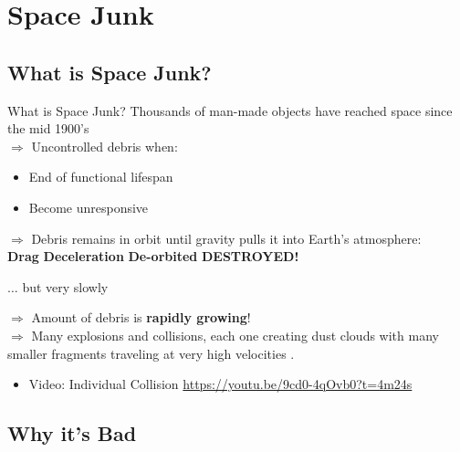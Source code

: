 \documentclass{beamer}
\begin{document}
\section{Space Junk}

\subsection{What is Space Junk?}

\begin{frame}{What is Space Junk?}
Thousands of man-made objects have reached space since the mid 1900's \cite{ODPO} \\
\(\Rightarrow{}\) Uncontrolled debris when:
    \begin{itemize}
        \item{End of functional lifespan}
        \item{Become unresponsive}
    \end{itemize}
\(\Rightarrow{}\) Debris remains in orbit until gravity pulls it into Earth's atmosphere:\\
\hspace{10mm} \rightarrow \textbf{Drag} \rightarrow \textbf{Deceleration} \rightarrow \textbf{De-orbited} \rightarrow \textbf{DESTROYED!}\\
\begin{center}
\(\dotsc{}\) but very slowly\\
\end{center}
\(\Rightarrow{}\) Amount of debris is \textbf{rapidly growing}!\\
\(\Rightarrow{}\) Many explosions and collisions, each one creating dust clouds with many smaller fragments traveling at very high velocities \cite{UN}.\\
 \begin{itemize}
  \item {
    Video: Individual Collision \url{https://youtu.be/9cd0-4qOvb0?t=4m24s}
  }
  \end{itemize}
\end{frame}

 
\subsection{Why it's Bad}
\end{document}
